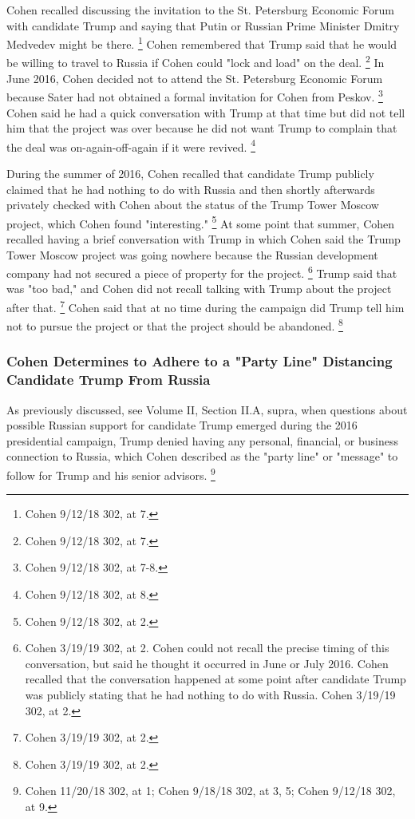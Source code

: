 Cohen recalled discussing the invitation to the St. Petersburg Economic Forum with candidate Trump and saying that Putin or Russian Prime Minister Dmitry Medvedev might be there.%
\footnote{Cohen 9/12/18 302, at 7.}
Cohen remembered that Trump said that he would be willing to travel to Russia if Cohen could "lock and load" on the deal.%
\footnote{Cohen 9/12/18 302, at 7.}
In June 2016, Cohen decided not to attend the St. Petersburg Economic Forum because Sater had not obtained a formal invitation for Cohen from Peskov.%
\footnote{Cohen 9/12/18 302, at 7-8.}
Cohen said he had a quick conversation with Trump at that time but did not tell him that the project was over because he did not want Trump to complain that the deal was on-again-off-again if it were revived.%
\footnote{Cohen 9/12/18 302, at 8.}

During the summer of 2016, Cohen recalled that candidate Trump publicly claimed that he had nothing to do with Russia and then shortly afterwards privately checked with Cohen about the status of the Trump Tower Moscow project, which Cohen found "interesting."%
\footnote{Cohen 9/12/18 302, at 2.}
At some point that summer, Cohen recalled having a brief conversation with Trump in which Cohen said the Trump Tower Moscow project was going nowhere because the Russian development company had not secured a piece of property for the project.%
\footnote{Cohen 3/19/19 302, at 2.
Cohen could not recall the precise timing of this conversation, but said he thought it occurred in June or July 2016.
Cohen recalled that the conversation happened at some point after candidate Trump was publicly stating that he had nothing to do with Russia.
Cohen 3/19/19 302, at 2.}
Trump said that was "too bad," and Cohen did not recall talking with Trump about the project after that.%
\footnote{Cohen 3/19/19 302, at 2.}
Cohen said that at no time during the campaign did Trump tell him not to pursue the project or that the project should be abandoned.%
\footnote{Cohen 3/19/19 302, at 2.}

\subsubsection{Cohen Determines to Adhere to a "Party Line" Distancing Candidate Trump From Russia}

As previously discussed, see Volume II, Section II.A, supra, when questions about possible Russian support for candidate Trump emerged during the 2016 presidential campaign, Trump denied having any personal, financial, or business connection to Russia, which Cohen described as the "party line" or "message" to follow for Trump and his senior advisors.%
\footnote{Cohen 11/20/18 302, at 1;
Cohen 9/18/18 302, at 3, 5;
Cohen 9/12/18 302, at 9.}

